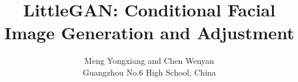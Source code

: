 \documentclass[conference,12pt,a4paper,compsoc,onecolumn,draft]{IEEEtran}
\begin{document}
\title{LittleGAN: Conditional Facial Image Generation and Adjustment}
\author{Meng Yongxiang and Chen Wenyan\\Guangzhou No.6 High School, China}

\maketitle
\tableofcontents









\newpage
{}



\end{document}

